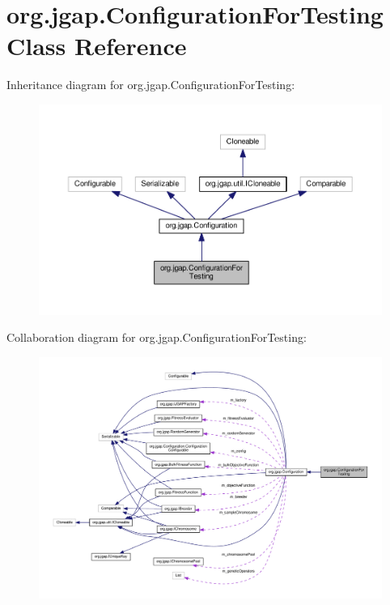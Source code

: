 \hypertarget{classorg_1_1jgap_1_1_configuration_for_testing}{\section{org.\-jgap.\-Configuration\-For\-Testing Class Reference}
\label{classorg_1_1jgap_1_1_configuration_for_testing}
}


Inheritance diagram for org.\-jgap.\-Configuration\-For\-Testing\-:
\nopagebreak
\begin{figure}[H]
\begin{center}
\leavevmode
\includegraphics[width=350pt]{classorg_1_1jgap_1_1_configuration_for_testing__inherit__graph}
\end{center}
\end{figure}


Collaboration diagram for org.\-jgap.\-Configuration\-For\-Testing\-:
\nopagebreak
\begin{figure}[H]
\begin{center}
\leavevmode
\includegraphics[width=350pt]{classorg_1_1jgap_1_1_configuration_for_testing__coll__graph}
\end{center}
\end{figure}
